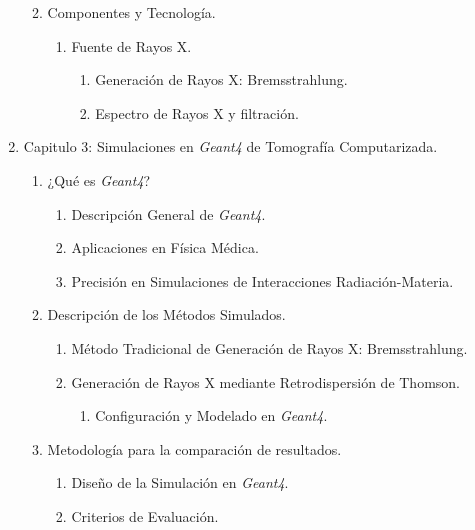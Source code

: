 \begin{enumerate}
\begin{enumerate}
\begin{enumerate}
        \end{enumerate}
        \item Componentes y Tecnología.
        \begin{enumerate}
            \item Fuente de Rayos X.
            \begin{enumerate}
                \item Generación de Rayos X: Bremsstrahlung.
                \item Espectro de Rayos X y filtración.
            \end{enumerate}
        \end{enumerate}
    \end{enumerate}
    \item Capitulo 3: Simulaciones en \textit{Geant4} de Tomografía Computarizada.
    \begin{enumerate}
        \item ¿Qué es \textit{Geant4}?
        \begin{enumerate}
            \item Descripción General de \textit{Geant4}.
            \item Aplicaciones en Física Médica.
            \item Precisión en Simulaciones de Interacciones Radiación-Materia.
        \end{enumerate}
        \item Descripción de los Métodos Simulados.
        \begin{enumerate}
            \item Método Tradicional de Generación de Rayos X: Bremsstrahlung.
            \item Generación de Rayos X mediante Retrodispersión de Thomson.
            \begin{enumerate}
                \item Configuración y Modelado en \textit{Geant4}.
            \end{enumerate}
        \end{enumerate}
        \item Metodología para la comparación de resultados.
        \begin{enumerate}
            \item Diseño de la Simulación en \textit{Geant4}.
            \item Criterios de Evaluación.
        \end{enumerate}

\end{enumerate}
\end{enumerate}
